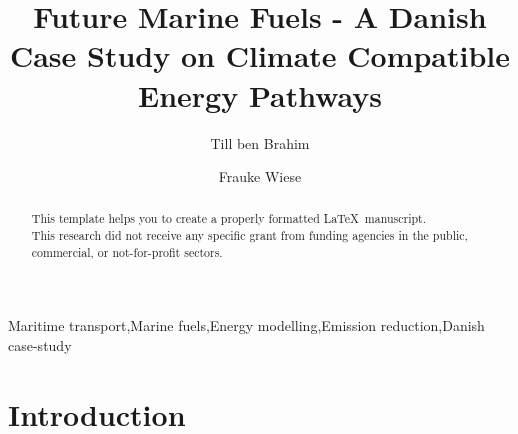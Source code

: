 \documentclass[article]{elsarticle}
\begin{document}
\begin{frontmatter}

\title{Future Marine Fuels - A Danish Case Study on Climate Compatible Energy Pathways}

\author[label1]{Till ben Brahim}
\address[label1]{Technical University of Denmark, Produktionstorvet, Bygning 426, 2800 Kongens Lyngby, Denmark}


\author[label1]{Frauke Wiese}

\begin{abstract}
This template helps you to create a properly formatted \LaTeX\ manuscript.
\\
This research did not receive any specific grant from funding agencies in the public, commercial, or
not-for-profit sectors.
\end{abstract}

\begin{keyword}
Maritime transport\sep Marine fuels\sep Energy modelling\sep Emission reduction\sep Danish case-study 
\end{keyword}

\end{frontmatter}

\linenumbers

\section{Introduction}
\end{document}
